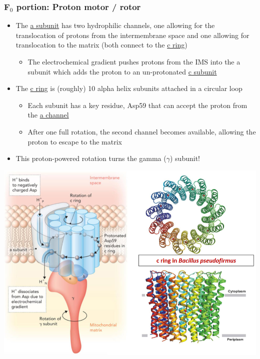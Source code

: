\documentclass[10pt]{article}
\begin{document}
\subsubsection*{F$_0$ portion: Proton motor / rotor}
\begin{itemize}
	\item The \underline{a subunit} has two hydrophilic channels, one allowing for the translocation of protons from the intermembrane space and one allowing for translocation to the matrix (both connect to the \underline{c ring})
	\begin{itemize}
        \item The electrochemical gradient pushes protons from the IMS into the a subunit which adds the proton to an un-protonated \underline{c subunit}
    \end{itemize}
    \item The \underline{c ring} is (roughly) 10 alpha helix subunits attached in a circular loop
    \begin{itemize}
        \item Each subunit has a key residue, Asp59 that can accept the proton from the \underline{a channel}
        \item After one full rotation, the second channel becomes available, allowing the proton to escape to the matrix
    \end{itemize}
    \item This proton-powered rotation turns the gamma ($\gamma$) subunit!
\end{itemize}
\begin{center} 
	\includegraphics*[width=\textwidth]{L3_3.png}
\end{center}
\end{document}
